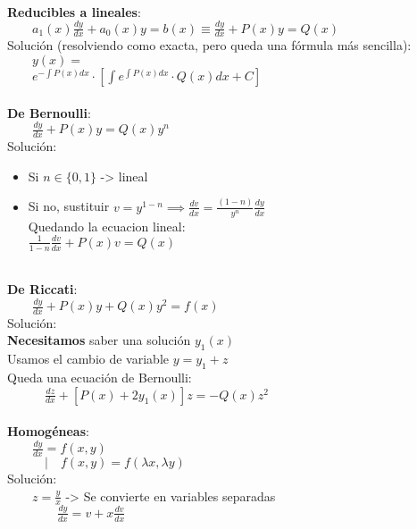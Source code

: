 \documentclass[a4paper,landscape,10pt]{cheatsheet}
\begin{document}
\hfill\\
\textbf{Reducibles a lineales}:\\
$\qquad a_1(x)\frac{dy}{dx}+a_0(x)y=b(x) \equiv \frac{dy}{dx}+P(x)y=Q(x)$\\
Solución (resolviendo como exacta, pero queda una fórmula más sencilla):\\
$\qquad y(x)=$\\
$\qquad e^{-\int P(x)dx}\cdot\left[\int e^{\int P(x)dx}\cdot Q(x)dx + C\right]$\\

\hfill\\
\textbf{De Bernoulli}:\\
$\qquad \frac{dy}{dx}+P(x)y=Q(x)y^n$\\
Solución:\\
\begin{itemize}
  \item Si $n\in\{0,1\}$ -> lineal\\
  \item Si no, sustituir $v=y^{1-n} \implies \frac{dv}{dx}=\frac{(1-n)}{y^n}\frac{dy}{dx}$
        \\ Quedando la ecuacion lineal:
        \\$\frac{1}{1-n}\frac{dv}{dx}+P(x)v=Q(x)$
\end{itemize}

\hfill\\
\textbf{De Riccati}:\\
$\qquad \frac{dy}{dx}+P(x)y+Q(x)y^2=f(x)$\\
Solución:\\
\qquad\textbf{Necesitamos} saber una solución $y_1(x)$\\
\qquad Usamos el cambio de variable $y=y_1+z$\\
\qquad Queda una ecuación de Bernoulli: \\
$\qquad\quad \frac{dz}{dx}+\left[P(x)+2y_1(x)\right]z=-Q(x)z^2$\\

\hfill\\
\textbf{Homogéneas}:\\
$\qquad \frac{dy}{dx}=f(x,y)$\\
$\qquad\quad | \quad f(x,y)=f(\lambda x, \lambda y)$\\
Solución:\\
$\qquad z=\frac{y}{x}$ -> Se convierte en variables separadas\\
$\qquad\qquad \frac{dy}{dx}=v+x\frac{dv}{dx}$
\end{document}
